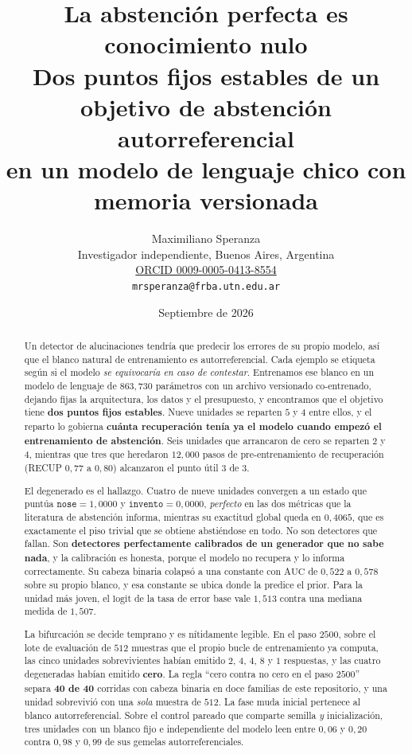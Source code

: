 \documentclass[11pt,a4paper]{article}
\title{\bfseries La abstención perfecta es conocimiento nulo\\
\large Dos puntos fijos estables de un objetivo de abstención autorreferencial\\
en un modelo de lenguaje chico con memoria versionada}
\author{Maximiliano Speranza\\
\small Investigador independiente, Buenos Aires, Argentina\\
\small \href{https://orcid.org/0009-0005-0413-8554}{ORCID 0009-0005-0413-8554}\\
\small \texttt{mrsperanza@frba.utn.edu.ar}}
\date{Septiembre de 2026}
\begin{document}
\maketitle

\begin{abstract}
\noindent
Un detector de alucinaciones tendría que predecir los errores de su propio modelo, así que el blanco
natural de entrenamiento es autorreferencial. Cada ejemplo se etiqueta según si el modelo
\emph{se equivocaría en caso de contestar}. Entrenamos ese blanco en un modelo de lenguaje de
$863{,}730$ parámetros con un archivo versionado co-entrenado, dejando fijas la arquitectura, los datos
y el presupuesto, y encontramos que el objetivo tiene \textbf{dos puntos fijos estables}. Nueve
unidades se reparten $5$ y $4$ entre ellos, y el reparto lo gobierna \textbf{cuánta recuperación tenía
ya el modelo cuando empezó el entrenamiento de abstención}. Seis unidades que arrancaron de cero se
reparten $2$ y $4$, mientras que tres que heredaron $12{,}000$ pasos de pre-entrenamiento de
recuperación (RECUP $0{,}77$ a $0{,}80$) alcanzaron el punto útil $3$ de $3$.

El degenerado es el hallazgo. Cuatro de nueve unidades convergen a un estado que puntúa
$\texttt{nose} = 1{,}0000$ y $\texttt{invento} = 0{,}0000$, \emph{perfecto} en las dos métricas que la
literatura de abstención informa, mientras su exactitud global queda en $0{,}4065$, que es exactamente
el piso trivial que se obtiene abstiéndose en todo. No son detectores que fallan. Son
\textbf{detectores perfectamente calibrados de un generador que no sabe nada}, y la calibración es
honesta, porque el modelo no recupera y lo informa correctamente. Su cabeza binaria colapsó a una
constante con $\mathrm{AUC}$ de $0{,}522$ a $0{,}578$ sobre su propio blanco, y esa constante se
ubica donde la predice el prior. Para la unidad más joven, el $\mathrm{logit}$ de la tasa de error base
vale $1{,}513$ contra una mediana medida de $1{,}507$.

La bifurcación se decide temprano y es nítidamente legible. En el paso $2500$, sobre el lote de
evaluación de $512$ muestras que el propio bucle de entrenamiento ya computa, las cinco unidades
sobrevivientes habían emitido $2$, $4$, $4$, $8$ y $1$ respuestas, y las cuatro degeneradas habían
emitido \textbf{cero}. La regla ``cero contra no cero en el paso $2500$'' separa \textbf{40 de 40}
corridas con cabeza binaria en doce familias de este repositorio, y una unidad sobrevivió con una
\emph{sola} muestra de $512$. La fase muda inicial pertenece al blanco autorreferencial. Sobre el
control pareado que comparte semilla \emph{y} inicialización, tres unidades con un blanco fijo e
independiente del modelo leen entre $0{,}06$ y $0{,}20$ contra $0{,}98$ y $0{,}99$ de sus gemelas
autorreferenciales.


\end{abstract}
\end{document}
